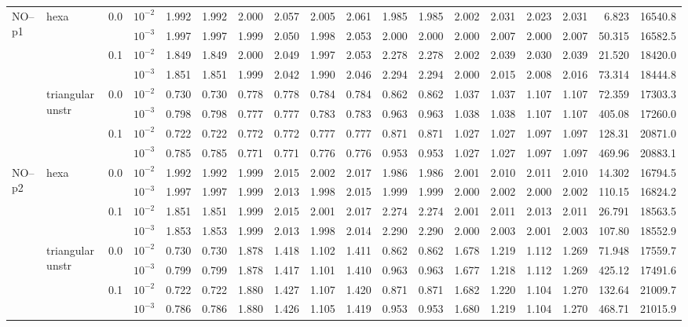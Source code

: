 \begin{longtable}{llclrrrrrrrrrrrrrr}
\multirow{8}{*}{NO--p1} & \multirow{4}{*}{hexa} & \multirow{2}{*}{0.0} & $10^{-2}$ & 1.992 & 1.992 & 2.000 & 2.057 & 2.005 & 2.061 & 1.985 & 1.985 & 2.002 & 2.031 & 2.023 & 2.031 & 6.823 & 16540.8 \\
& & & $10^{-3}$ & 1.997 & 1.997 & 1.999 & 2.050 & 1.998 & 2.053 & 2.000 & 2.000 & 2.000 & 2.007 & 2.000 & 2.007 & 50.315 & 16582.5 \\\cline{3-18}
& & \multirow{2}{*}{0.1} & $10^{-2}$ & 1.849 & 1.849 & 2.000 & 2.049 & 1.997 & 2.053 & 2.278 & 2.278 & 2.002 & 2.039 & 2.030 & 2.039 & 21.520 & 18420.0 \\
& & & $10^{-3}$ & 1.851 & 1.851 & 1.999 & 2.042 & 1.990 & 2.046 & 2.294 & 2.294 & 2.000 & 2.015 & 2.008 & 2.016 & 73.314 & 18444.8 \\\cline{2-18}
& \multirow{4}{*}{triangular unstr} & \multirow{2}{*}{0.0} & $10^{-2}$ & 0.730 & 0.730 & 0.778 & 0.778 & 0.784 & 0.784 & 0.862 & 0.862 & 1.037 & 1.037 & 1.107 & 1.107 & 72.359 & 17303.3 \\
& & & $10^{-3}$ & 0.798 & 0.798 & 0.777 & 0.777 & 0.783 & 0.783 & 0.963 & 0.963 & 1.038 & 1.038 & 1.107 & 1.107 & 405.08 & 17260.0 \\\cline{3-18}
& & \multirow{2}{*}{0.1} & $10^{-2}$ & 0.722 & 0.722 & 0.772 & 0.772 & 0.777 & 0.777 & 0.871 & 0.871 & 1.027 & 1.027 & 1.097 & 1.097 & 128.31 & 20871.0 \\
& & & $10^{-3}$ & 0.785 & 0.785 & 0.771 & 0.771 & 0.776 & 0.776 & 0.953 & 0.953 & 1.027 & 1.027 & 1.097 & 1.097 & 469.96 & 20883.1 \\\hline

\multirow{8}{*}{NO--p2} & \multirow{4}{*}{hexa} & \multirow{2}{*}{0.0} & $10^{-2}$ & 1.992 & 1.992 & 1.999 & 2.015 & 2.002 & 2.017 & 1.986 & 1.986 & 2.001 & 2.010 & 2.011 & 2.010 & 14.302 & 16794.5 \\
& & & $10^{-3}$ & 1.997 & 1.997 & 1.999 & 2.013 & 1.998 & 2.015 & 1.999 & 1.999 & 2.000 & 2.002 & 2.000 & 2.002 & 110.15 & 16824.2 \\\cline{3-18}
& & \multirow{2}{*}{0.1} & $10^{-2}$ & 1.851 & 1.851 & 1.999 & 2.015 & 2.001 & 2.017 & 2.274 & 2.274 & 2.001 & 2.011 & 2.013 & 2.011 & 26.791 & 18563.5 \\
& & & $10^{-3}$ & 1.853 & 1.853 & 1.999 & 2.013 & 1.998 & 2.014 & 2.290 & 2.290 & 2.000 & 2.003 & 2.001 & 2.003 & 107.80 & 18552.9 \\\cline{2-18}
& \multirow{4}{*}{triangular unstr} & \multirow{2}{*}{0.0} & $10^{-2}$ & 0.730 & 0.730 & 1.878 & 1.418 & 1.102 & 1.411 & 0.862 & 0.862 & 1.678 & 1.219 & 1.112 & 1.269 & 71.948 & 17559.7 \\
& & & $10^{-3}$ & 0.799 & 0.799 & 1.878 & 1.417 & 1.101 & 1.410 & 0.963 & 0.963 & 1.677 & 1.218 & 1.112 & 1.269 & 425.12 & 17491.6 \\\cline{3-18}
& & \multirow{2}{*}{0.1} & $10^{-2}$ & 0.722 & 0.722 & 1.880 & 1.427 & 1.107 & 1.420 & 0.871 & 0.871 & 1.682 & 1.220 & 1.104 & 1.270 & 132.64 & 21009.7 \\
& & & $10^{-3}$ & 0.786 & 0.786 & 1.880 & 1.426 & 1.105 & 1.419 & 0.953 & 0.953 & 1.680 & 1.219 & 1.104 & 1.270 & 468.71 & 21015.9 \\\hline


\end{longtable}
